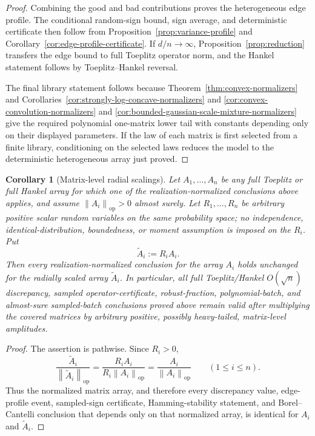 \documentclass[11pt]{amsart}
\numberwithin{equation}{section}
\newtheorem{corollary}[theorem]{Corollary}
\theoremstyle{definition}
\theoremstyle{remark}
\newcommand{\op}{\mathrm{op}}
\newcommand{\norm}[1]{\left\lVert #1\right\rVert}
\begin{document}
\begin{proof}
Combining the good and bad contributions proves the heterogeneous edge profile.
The conditional random-sign bound, sign average, and deterministic certificate
then follow from Proposition~\ref{prop:variance-profile} and
Corollary~\ref{cor:edge-profile-certificate}.  If \(d/n\to\infty\),
Proposition~\ref{prop:reduction} transfers the edge bound to full Toeplitz
operator norm, and the Hankel statement follows by Toeplitz--Hankel reversal.

The final library statement follows because
Theorem~\ref{thm:convex-normalizers} and
Corollaries~\ref{cor:strongly-log-concave-normalizers} and
\ref{cor:convex-convolution-normalizers} and
\ref{cor:bounded-gaussian-scale-mixture-normalizers} give the required
polynomial one-matrix lower tail with constants depending only on their
displayed parameters.  If the law of each matrix is first selected from a finite library,
conditioning on the selected laws reduces the model to the deterministic
heterogeneous array just proved.
\end{proof}

\begin{corollary}[Matrix-level radial scalings]
\label{cor:matrix-level-radial-normalization}
Let \(A_1,\ldots,A_n\) be any full Toeplitz or full Hankel array for which one
of the realization-normalized conclusions above applies, and assume
\(\norm{A_i}_{\op}>0\) almost surely.  Let \(R_1,\ldots,R_n\) be arbitrary
positive scalar random variables on the same probability space; no independence,
identical-distribution, boundedness, or moment assumption is imposed on the
\(R_i\).  Put
\[
  \widetilde A_i:=R_iA_i .
\]
Then every realization-normalized conclusion for the array \(A_i\) holds
unchanged for the radially scaled array \(\widetilde A_i\).  In particular, all
full Toeplitz/Hankel \(O(\sqrt n)\) discrepancy, sampled operator-certificate,
robust-fraction, polynomial-batch, and almost-sure sampled-batch conclusions
proved above remain valid after multiplying the covered matrices by arbitrary
positive, possibly heavy-tailed, matrix-level amplitudes.
\end{corollary}

\begin{proof}
The assertion is pathwise.  Since \(R_i>0\),
\[
  \frac{\widetilde A_i}{\norm{\widetilde A_i}_{\op}}
  =
  \frac{R_iA_i}{R_i\norm{A_i}_{\op}}
  =
  \frac{A_i}{\norm{A_i}_{\op}}
  \qquad(1\le i\le n).
\]
Thus the normalized matrix array, and therefore every discrepancy value,
edge-profile event, sampled-sign certificate, Hamming-stability statement, and
Borel--Cantelli conclusion that depends only on that normalized array, is
identical for \(A_i\) and \(\widetilde A_i\).
\end{proof}
\end{document}

